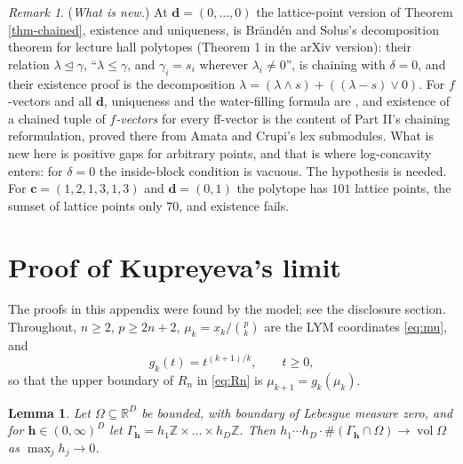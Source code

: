 \documentclass[11pt, a4paper, abstract=yes]{scrartcl}
\theoremstyle{definition}
\theoremstyle{remark}
\newtheorem{remark}[definition]{Remark}
\theoremstyle{plain}
\newtheorem{lemma}[definition]{Lemma}
\newcommand{\vek}[1]{\boldsymbol{#1}}
\theoremstyle{remark}
\theoremstyle{plain}
\newcommand{\vol}{\operatorname{vol}}
\newcommand{\leannone}{\tikz[baseline=-0.6ex]\draw[leannone,line width=0.6pt] (0,0) circle (0.55ex);}
\newcommand{\leanmark}[1]{\leavevmode{\reversemarginpar\marginnote{\raggedleft#1}}}
\let\autocite\cite
\begin{document}
\begin{remark}
(\emph{What is new.}) At \(\vek d=(0,\dots,0)\) the lattice-point version of Theorem \ref{thm-chained},
existence and uniqueness, is Brändén and Solus's decomposition theorem for lecture hall polytopes
\autocite[Theorem 2.1]{BrandenSolus2020} (Theorem 1 in the arXiv version): their relation
\(\lambda\trianglelefteq\gamma\), ``\(\lambda\le\gamma\), and \(\gamma_i=s_i\) wherever
\(\lambda_i\ne0\)'', is chaining with \(\delta=0\), and their existence proof is the decomposition
\(\lambda=(\lambda\wedge s)+((\lambda-s)\vee0)\). For \(f\)-vectors and all \(\vek d\), uniqueness and the
water-filling formula are \autocite[Lemma 24]{SnellmanArticle2}, and existence of a chained tuple of \emph{\(f\)-vectors}
for every ff-vector is the content of Part II's chaining reformulation, proved there from Amata and
Crupi's lex submodules. What is new here is positive gaps for arbitrary points, and that is where
log-concavity enters: for \(\delta=0\) the inside-block condition is vacuous. The hypothesis is
needed. For \(\vek c=(1,2,1,3,1,3)\) and \(\vek d=(0,1)\) the polytope has \(101\) lattice points,
the sumset of lattice points only \(70\), and existence fails.
\label{rem-chained-credit}
\end{remark}
\section{Proof of Kupreyeva's limit}
\label{sec-app-kupreyeva}
The proofs in this appendix were found by the model; see the disclosure section. Throughout,
\(n\ge2\), \(p\ge2n+2\), \(\mu_k=x_k/\binom pk\) are the LYM coordinates \eqref{eq:mu}, and
\begin{equation}\label{eq:gk}
  g_k(t)=t^{(k+1)/k},\qquad t\ge0 ,
\end{equation}
so that the upper boundary of \(R_n\) in \eqref{eq:Rn} is \(\mu_{k+1}=g_k(\mu_k)\).

\begin{lemma}
\leanmark{\leannone}Let \(\Omega\subseteq\mathbb R^D\) be bounded, with boundary of Lebesgue measure zero, and for
\(\vek h\in(0,\infty)^D\) let \(\Gamma_{\vek h}=h_1\mathbb Z\times\dots\times h_D\mathbb Z\). Then
\(h_1\cdots h_D\cdot\#(\Gamma_{\vek h}\cap\Omega)\to\vol\Omega\) as \(\max_jh_j\to0\).
\label{lem-anisotropic-count}
\end{lemma}
\end{document}
